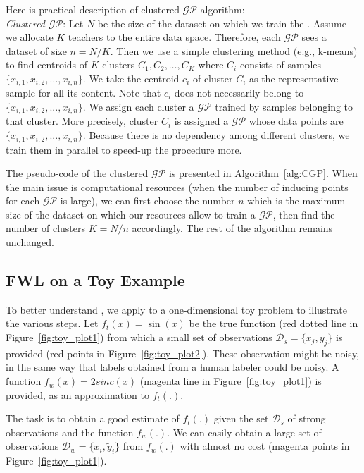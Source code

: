 Here is practical description of clustered $\mathcal{GP}$ algorithm:\\
{\it Clustered $\mathcal{GP}$}: Let $N$ be the size of the dataset on which we train the \tch. Assume we allocate $K$ teachers to the entire data space. Therefore, each $\mathcal{GP}$ sees a dataset of size $n=N/K$.
Then we use a simple clustering method (e.g., k-means) to find centroids of $K$ clusters $C_1, C_2, \ldots, C_K$ where $C_i$ consists of samples $\{x_{i,1}, x_{i,2},\ldots,x_{i,n}\}$. We take the centroid $c_i$ of cluster $C_i$ as the representative sample for all its content. Note that $c_i$ does not necessarily belong to $\{x_{i,1}, x_{i,2},...,x_{i,n}\}$. We assign each cluster a $\mathcal{GP}$ trained by samples belonging to that cluster. More precisely, cluster $C_i$ is assigned a $\mathcal{GP}$ whose data points are $\{x_{i,1}, x_{i,2},...,x_{i,n}\}$.
Because there is no dependency among different clusters, we train them in parallel to speed-up the procedure more. 

The pseudo-code of the clustered $\mathcal{GP}$ is presented in Algorithm~\ref{alg:CGP}. When the main issue is computational resources (when the number of inducing points for each $\mathcal{GP}$ is large), we can first choose the number $n$ which is the maximum size of the dataset on which our resources allow to train a $\mathcal{GP}$, then find the number of clusters $K=N/n$ accordingly. The rest of the algorithm remains unchanged. 



\subsection{FWL on a Toy Example}
\label{sec:toy_exmpale}

To better understand \fwl, we apply \fwl to a one-dimensional toy problem to illustrate the various steps.
%
Let $f_t(x)=\sin(x)$ be the true function (red dotted line in Figure~\ref{fig:toy_plot1}) from which a small set of observations $\mathcal{D}_s=\{x_j,y_j\}$ is provided (red points in Figure~\ref{fig:toy_plot2}). These observation might be noisy, in the same way that labels obtained from a human labeler could be noisy.
%
A \wa function $f_{w}(x)=2sinc(x)$ (magenta line in Figure~\ref{fig:toy_plot1}) is provided, as an approximation to $f_t(.)$.

%
The task is to obtain a good estimate of $f_t(.)$ given the set $\mathcal{D}_s$ of strong observations and the \wa function $f_{w}(.)$.
%
We can easily obtain a large set of observations $\mathcal{D}_w=\{x_i,\tilde{y}_i\}$ from $f_{w}(.)$ with almost no cost (magenta points in Figure~\ref{fig:toy_plot1}). 


